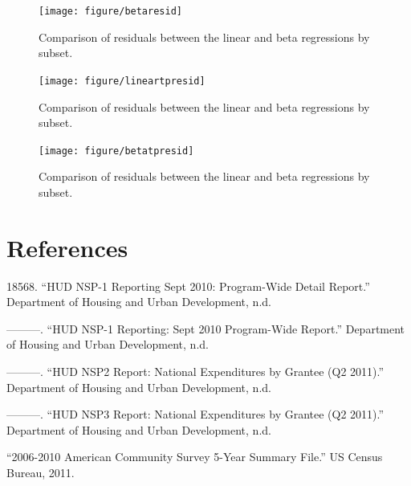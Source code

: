\documentclass[12pt,oneside]{psthesis}
\begin{document}
\begin{figure}

{\centering \texttt{[image: figure/betaresid]} 

}

\caption{Comparison of residuals between the linear and beta regressions by subset.}\label{fig:resids2}
\end{figure}
\begin{figure}

{\centering \texttt{[image: figure/lineartpresid]} 

}

\caption{Comparison of residuals between the linear and beta regressions by subset.}\label{fig:resids3}
\end{figure}
\begin{figure}

{\centering \texttt{[image: figure/betatpresid]} 

}

\caption{Comparison of residuals between the linear and beta regressions by subset.}\label{fig:resids4}
\end{figure}
\backmatter

\hypertarget{references}{%
\chapter{References}\label{references}}

\setlength{\parindent}{-0.25in}
\setlength{\leftskip}{0.25in}

\noindent

\hypertarget{refs}{}
\leavevmode\hypertarget{ref-185682010huda}{}%
18568. ``HUD NSP-1 Reporting Sept 2010: Program-Wide Detail Report.'' Department of Housing and Urban Development, n.d.

\leavevmode\hypertarget{ref-185682010hud}{}%
---------. ``HUD NSP-1 Reporting: Sept 2010 Program-Wide Report.'' Department of Housing and Urban Development, n.d.

\leavevmode\hypertarget{ref-185682011huda}{}%
---------. ``HUD NSP2 Report: National Expenditures by Grantee (Q2 2011).'' Department of Housing and Urban Development, n.d.

\leavevmode\hypertarget{ref-185682011hud}{}%
---------. ``HUD NSP3 Report: National Expenditures by Grantee (Q2 2011).'' Department of Housing and Urban Development, n.d.

\leavevmode\hypertarget{ref-201120062010}{}%
``2006-2010 American Community Survey 5-Year Summary File.'' US Census Bureau, 2011.
\end{document}
